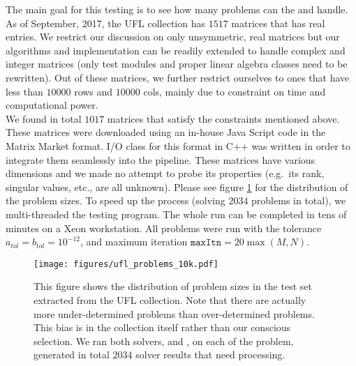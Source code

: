 \documentclass[10pt,letterpaper]{article}
\newcommand{\alg}[1]{\textproc{#1}}
\begin{document}
The main goal for this testing is to see how many problems can the
\alg{USYMLQ} and \alg{USYMQR} handle. As of September, 2017, the UFL
collection has $1517$ matrices that has real entries. We restrict our 
discussion on only unsymmetric, real matrices but our algorithms and 
implementation can be readily extended to handle complex and integer
matrices (only test modules and proper linear algebra classes need to 
be rewritten).  Out of these matrices, we further restrict ourselves 
to ones that have less than $10000$ rows and $10000$ cols, mainly 
due to constraint on time and computational power. \\

We found in total $1017$ matrices that satisfy the constraints mentioned
above. These matrices were downloaded using an in-house Java
Script code in the Matrix Market format. I/O class for this format
in C++ was written in order to integrate them seamlessly into the 
pipeline. These matrices have various dimensions and we made no
attempt to probe its properties (e.g.~its rank, singular values, etc.,
are all unknown). Please see figure \ref{fig:ufl_size} for the distribution
of the problem sizes. To speed up the process (solving $2034$ problems
in total), we multi-threaded the testing program. The whole run can 
be completed in tens of minutes on a Xeon workstation. All problems were run
with the tolerance $a_{tol} = b_{tol} = 10^{-12}$, and maximum iteration 
$\texttt{maxItn} = 20\max(M,N)$. 

\begin{figure}[H]
    \centering
    \texttt{[image: figures/ufl\_problems\_10k.pdf]}
    \caption{This figure shows the distribution of problem sizes in the
             test set extracted from the UFL collection. Note that there
             are actually more under-determined problems than 
             over-determined problems. This bias is in the collection
             itself rather than our conscious selection. We ran both
             solvers, \alg{USYMLQ} and \alg{USYMQR}, on each of the 
             problem, generated in total $2034$ solver results that
             need processing.}
    \label{fig:ufl_size}
\end{figure}
\end{document}
